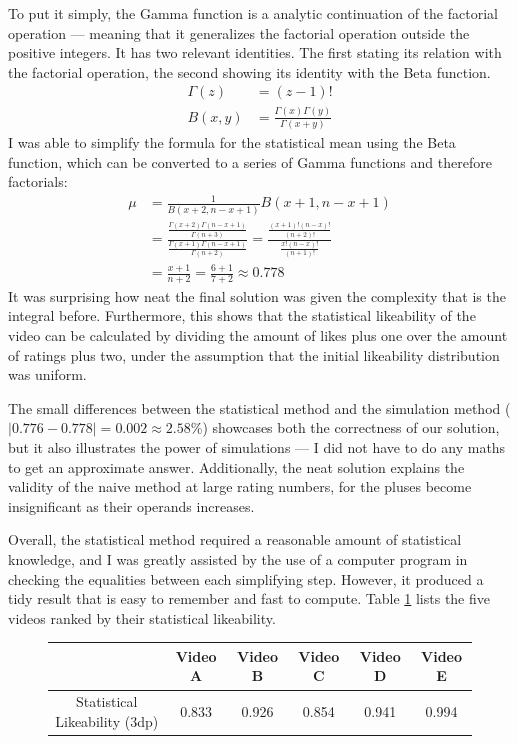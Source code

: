 \documentclass[a4paper,11pt]{article}
\begin{document}
To put it simply, the Gamma function is a analytic continuation of the factorial operation --- meaning that it generalizes the factorial operation outside the positive integers. It has two relevant identities. The first stating its relation with the factorial operation, the second showing its identity with the Beta function.
\begin{align*}
    \Gamma(z) &= (z-1)!\\
    B(x, y) &= \frac{\Gamma(x) \Gamma(y)}{\Gamma(x + y)}
\end{align*}
I was able to simplify the formula for the statistical mean using the Beta function, which can be converted to a series of Gamma functions and therefore factorials:
\begin{align*}
    \mu &= \frac{1}{B(x+2, n-x+1)}B(x+1, n-x+1)\\
    &= \frac{\frac{\Gamma(x+2)\Gamma(n-x+1)}{\Gamma(n+3)}}{\frac{\Gamma(x+1)\Gamma(n-x+1)}{\Gamma(n+2)}} =  \frac{\frac{(x+1)!(n-x)!}{(n+2)!}}{\frac{x!(n-x)!}{(n+1)!}}\\
    &= \frac{x+1}{n+2} = \frac{6+1}{7+2} \approx 0.778
\end{align*}
It was surprising how neat the final solution was given the complexity that is the integral before. Furthermore, this shows that the statistical likeability of the video can be calculated by dividing the amount of likes plus one over the amount of ratings plus two, under the assumption that the initial likeability distribution was uniform.

The small differences between the statistical method and the simulation method ($|0.776 - 0.778| = 0.002 \approx 2.58\%$) showcases both the correctness of our solution, but it also illustrates the power of simulations --- I did not have to do any maths to get an approximate answer. Additionally, the neat solution explains the validity of the naive method at large rating numbers, for the pluses become insignificant as their operands increases.

Overall, the statistical method required a reasonable amount of statistical knowledge, and I was greatly assisted by the use of a computer program in checking the equalities between each simplifying step. However, it produced a tidy result that is easy to remember and fast to compute. Table \ref{tbl:stat} lists the five videos ranked by their statistical likeability.

\begin{figure}[H]
    \centering
    \begin{tabular}{c|c|c|c|c|c}
        & Video A & Video B & Video C & Video D & Video E \\
        \hline
        \hline
        Statistical Likeability (3dp) & 0.833 & 0.926 & 0.854 & 0.941 & 0.994
    \end{tabular}
    \label{tbl:stat}
\end{figure}
\end{document}
